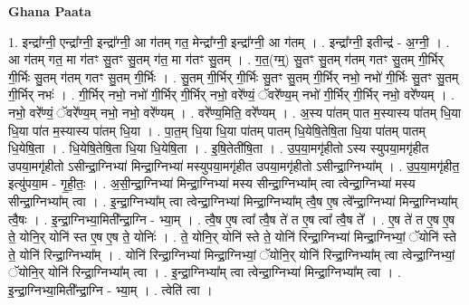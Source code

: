 \documentclass[17pt]{extarticle}
\begin{document}
\textbf{Ghana Paata } \newline

1. इन्द्रा᳚ग्नी॒ एन्द्रा᳚ग्नी॒ इन्द्रा᳚ग्नी॒ आ ग॑तम् गत॒ मेन्द्रा᳚ग्नी॒ इन्द्रा᳚ग्नी॒ आ ग॑तम् । . इन्द्रा᳚ग्नी॒ इतीन्द्र॑ - अ॒ग्नी॒ । . आ ग॑तम् गत॒ मा ग॑तꣳ सु॒तꣳ सु॒तम् ग॑त॒ मा ग॑तꣳ सु॒तम् । . ग॒त॒(ग्म्॒) सु॒तꣳ सु॒तम् ग॑तम् गतꣳ सु॒तम् गी॒र्भिर् गी॒र्भिः सु॒तम् ग॑तम् गतꣳ सु॒तम् गी॒र्भिः । . सु॒तम् गी॒र्भिर् गी॒र्भिः सु॒तꣳ सु॒तम् गी॒र्भिर् नभो॒ नभो॑ गी॒र्भिः सु॒तꣳ सु॒तम् गी॒र्भिर् नभः॑ । . गी॒र्भिर् नभो॒ नभो॑ गी॒र्भिर् गी॒र्भिर् नभो॒ वरे᳚ण्यं॒ ॅवरे᳚ण्य॒म् नभो॑ गी॒र्भिर् गी॒र्भिर् नभो॒ वरे᳚ण्यम् । . नभो॒ वरे᳚ण्यं॒ ॅवरे᳚ण्य॒म् नभो॒ नभो॒ वरे᳚ण्यम् । . वरे᳚ण्य॒मिति॒ वरे᳚ण्यम् । . अ॒स्य पा॑तम् पात म॒स्यास्य पा॑तम् धि॒या धि॒या पा॑त म॒स्यास्य पा॑तम् धि॒या । . पा॒त॒म् धि॒या धि॒या पा॑तम् पातम् धि॒येषि॒तेषि॒ता धि॒या पा॑तम् पातम् धि॒येषि॒ता । . धि॒येषि॒तेषि॒ता धि॒या धि॒येषि॒ता । . इ॒षि॒तेती॑षि॒ता । . उ॒प॒या॒मगृ॑हीतो ऽस्य स्युपया॒मगृ॑हीत उपया॒मगृ॑हीतो ऽसीन्द्रा॒ग्निभ्या॑ मिन्द्रा॒ग्निभ्या॑ मस्युपया॒मगृ॑हीत उपया॒मगृ॑हीतो ऽसीन्द्रा॒ग्निभ्या᳚म् । . उ॒प॒या॒मगृ॑हीत॒ इत्यु॑पया॒म - गृ॒ही॒तः॒ । . अ॒सी॒न्द्रा॒ग्निभ्या॑ मिन्द्रा॒ग्निभ्या॑ मस्य सीन्द्रा॒ग्निभ्या᳚म् त्वा त्वेन्द्रा॒ग्निभ्या॑ मस्य सीन्द्रा॒ग्निभ्या᳚म् त्वा । . इ॒न्द्रा॒ग्निभ्या᳚म् त्वा त्वेन्द्रा॒ग्निभ्या॑ मिन्द्रा॒ग्निभ्या᳚म् त्वै॒ष ए॒ष त्वे᳚न्द्रा॒ग्निभ्या॑ मिन्द्रा॒ग्निभ्या᳚म् त्वै॒षः । . इ॒न्द्रा॒ग्निभ्या॒मिती᳚न्द्रा॒ग्नि - भ्या॒म् । . त्वै॒ष ए॒ष त्वा᳚ त्वै॒ष ते॑ त ए॒ष त्वा᳚ त्वै॒ष ते᳚ । . ए॒ष ते॑ त ए॒ष ए॒ष ते॒ योनि॒र् योनि॑ स्त ए॒ष ए॒ष ते॒ योनिः॑ । . ते॒ योनि॒र् योनि॑ स्ते ते॒ योनि॑ रिन्द्रा॒ग्निभ्या॑ मिन्द्रा॒ग्निभ्यां॒ ॅयोनि॑ स्ते ते॒ योनि॑ रिन्द्रा॒ग्निभ्या᳚म् । . योनि॑ रिन्द्रा॒ग्निभ्या॑ मिन्द्रा॒ग्निभ्यां॒ ॅयोनि॒र् योनि॑ रिन्द्रा॒ग्निभ्या᳚म् त्वा त्वेन्द्रा॒ग्निभ्यां॒ ॅयोनि॒र् योनि॑ रिन्द्रा॒ग्निभ्या᳚म् त्वा । . इ॒न्द्रा॒ग्निभ्या᳚म् त्वा त्वेन्द्रा॒ग्निभ्या॑ मिन्द्रा॒ग्निभ्या᳚म् त्वा । . इ॒न्द्रा॒ग्निभ्या॒मिती᳚न्द्रा॒ग्नि - भ्या॒म् । . त्वेति॑ त्वा । \newline
\pagebreak
{}
\end{document}

